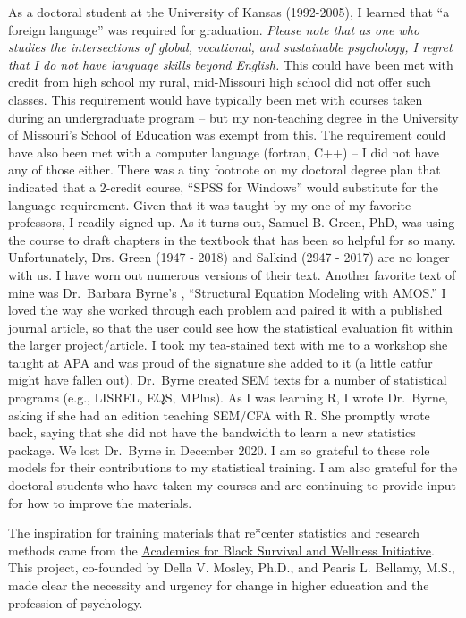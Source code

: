 \documentclass[
]{book}
\begin{document}
As a doctoral student at the University of Kansas (1992-2005), I learned that ``a foreign language'' was required for graduation. \emph{Please note that as one who studies the intersections of global, vocational, and sustainable psychology, I regret that I do not have language skills beyond English.} This could have been met with credit from high school my rural, mid-Missouri high school did not offer such classes. This requirement would have typically been met with courses taken during an undergraduate program -- but my non-teaching degree in the University of Missouri's School of Education was exempt from this. The requirement could have also been met with a computer language (fortran, C++) -- I did not have any of those either. There was a tiny footnote on my doctoral degree plan that indicated that a 2-credit course, ``SPSS for Windows'' would substitute for the language requirement. Given that it was taught by my one of my favorite professors, I readily signed up. As it turns out, Samuel B. Green, PhD, was using the course to draft chapters in the textbook \citep{green_using_2014} that has been so helpful for so many. Unfortunately, Drs. Green (1947 - 2018) and Salkind (2947 - 2017) are no longer with us. I have worn out numerous versions of their text. Another favorite text of mine was Dr.~Barbara Byrne's \citeyearpar{byrne_structural_2016}, ``Structural Equation Modeling with AMOS.'' I loved the way she worked through each problem and paired it with a published journal article, so that the user could see how the statistical evaluation fit within the larger project/article. I took my tea-stained text with me to a workshop she taught at APA and was proud of the signature she added to it (a little catfur might have fallen out). Dr.~Byrne created SEM texts for a number of statistical programs (e.g., LISREL, EQS, MPlus). As I was learning R, I wrote Dr.~Byrne, asking if she had an edition teaching SEM/CFA with R. She promptly wrote back, saying that she did not have the bandwidth to learn a new statistics package. We lost Dr.~Byrne in December 2020. I am so grateful to these role models for their contributions to my statistical training. I am also grateful for the doctoral students who have taken my courses and are continuing to provide input for how to improve the materials.

The inspiration for training materials that re*center statistics and research methods came from the \href{https://www.academics4blacklives.com/}{Academics for Black Survival and Wellness Initiative}. This project, co-founded by Della V. Mosley, Ph.D., and Pearis L. Bellamy, M.S., made clear the necessity and urgency for change in higher education and the profession of psychology.
\end{document}
